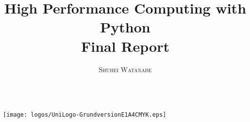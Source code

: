 \documentclass[a4paper,11pt]{report}
\title{\Huge \textbf{High Performance Computing with Python} \vspace{4mm} \\ \huge Final Report}
\author{\textsc{Shuhei Watanabe} \\ \vspace{3mm}\text{5171091}  \\
\vspace{3mm}\text{watanabs@informatik.uni-freiburg.de}}
\renewcommand{\_}{{\tiny \textunderscore}}
\begin{document}
\makeatletter
    \begin{titlepage}
        \begin{center}
            \texttt{[image: logos/Uni\_Logo-Grundversion\_E1\_A4\_CMYK.eps]}\\[4ex]
            {\huge \bfseries  \@title }\\[2ex] 
            {\LARGE  \@author}\\[30ex] 
            {\large \@date}
        \end{center}
    \end{titlepage}
\makeatother
\thispagestyle{empty}
\newpage

\tableofcontents

\begin{comment}
    https://publikationen.uni-tuebingen.de/xmlui/bitstream/handle/10900/87663/bwHPC2018-25-Pastewka-Lattice_Boltzmann_with_Python.pdf?sequence=1&isAllowed=y
    Criterion
    o 1. Shear wave decay
        o 1.1. Density evolution plot
        o 1.2. Velocity evolution plot
        o 1.3. Measured viscosity
    o 2. Couette flow
        o 2.1. velocity evolution
    o 3. Poissuille flow
        o 3.1. velocity evolution
    o 4. Flow in box with sliding lid
        o 4.1. stable simulation for long times
    o 5. Parallelization
        o 5.1. scaling plot
    
    Paper structure
    1. Overall structure
    2. Clarity of language
    3. Complete bibliography
    4. Clarity of figures
    5. Mathematical precision
    6. Reproducibility

    potential outline
    1. Introduction
    2. Methods
    3. Implementation
    4. Results
    5. Conclusion
\end{comment}













\end{document}
